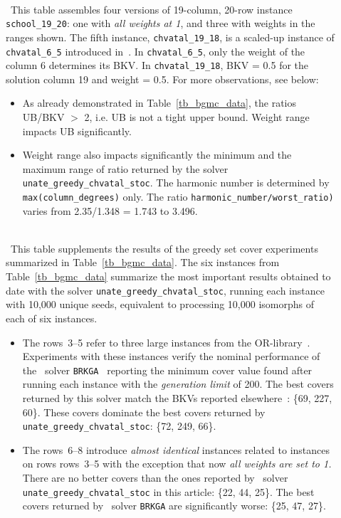 \begin{description}

\item[]~\\\
This table assembles four versions of 19-column, 20-row instance 
{\tt school\_19\_20}: one with {\it all weights at 1}, and three with
weights in the ranges shown.
The fifth instance, {\tt chvatal\_19\_18}, is
a scaled-up instance of {\tt chvatal\_6\_5} introduced 
in~\cite{OPUS-setc-1979-OR-Chvatal-greedy}.
In {\tt chvatal\_6\_5}, only the weight of the column 6
determines its BKV.  In {\tt chvatal\_19\_18},
BKV = 0.5 for the solution column 19 and weight = 0.5.
For more observations, see below:
\begin{itemize}
\item
As already demonstrated in Table~\ref{tb_bgmc_data},
the ratios UB/BKV $>$ 2, i.e. UB is not a tight upper bound. 
Weight range %
impacts UB significantly.
\item
Weight range also impacts significantly 
the minimum and the maximum range of ratio 
returned by the solver {\tt unate\_greedy\_chvatal\_stoc}.
The harmonic number is determined by
{\tt max(column\_degrees)} only.
The ratio {\tt harmonic\_number/worst\_ratio)} 
varies from 2.35/1.348 = 1.743 to 3.496.
\end{itemize}


\item[]~\\\
This table supplements the results of 
the greedy set cover experiments summarized in Table~\ref{tb_bgmc_data}.
The six instances from 
Table~\ref{tb_bgmc_data} 
summarize the most important results obtained to date with
the solver {\tt unate\_greedy\_chvatal\_stoc},
running each instance with 10,000 unique seeds,
equivalent to processing 10,000  isomorphs 
of each of six instances.
\begin{itemize}
\item
The {rows~3--5} refer to three large instances from the 
OR-library~\cite{OPUS-setc-2014-orlib-Beasley}.
Experiments with these instances
verify the nominal performance of the 
\CPP~solver 
{\tt BRKGA}~\cite{
  OPUS-setc-2014-BRKGA-Resende-code,
  OPUS-setc-2014-BRKGA-Resende} 
reporting the minimum cover value found after running each instance 
with the {\it generation limit} of 200.
The best covers
returned by this solver match the BKVs reported 
elsewhere~\cite{OPUS-setc-2014-SWJ-Broderick-Bee_Colony}:
\{69, 227, 60\}. These covers dominate 
the best covers returned by
{\tt unate\_greedy\_chvatal\_stoc}: 
\{72, 249, 66\}.
\item
The {rows~6--8} introduce {\it almost identical} instances
related to instances on rows  {rows~3--5} with the exception that now 
{\it all weights are set to 1.}
There are no better covers 
than the ones reported by 
\R~solver {\tt unate\_greedy\_chvatal\_stoc} in this article:
\{22, 44, 25\}. The best covers 
returned by  \CPP~solver {\tt BRKGA} are significantly worse:
\{25, 47, 27\}. 
\end{itemize}


\end{description}
